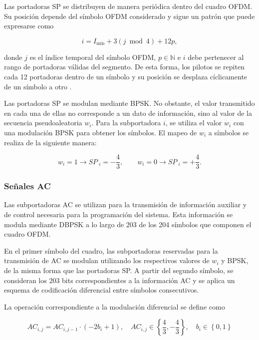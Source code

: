 Las portadoras SP se distribuyen de manera periódica dentro del cuadro OFDM. Su posición depende del símbolo OFDM considerado y sigue un patrón que puede expresarse como

\begin{equation}
i = I_{\min} + 3(j \bmod 4) + 12p,
\end{equation}

donde $j$ es el índice temporal del símbolo OFDM, $p \in \mathbb{N}$ e $i$ debe pertenecer al rango de portadoras válidas del segmento. De esta forma, los pilotos se repiten cada 12 portadoras dentro de un símbolo y su posición se desplaza cíclicamente de un símbolo a otro \cite{portugues}.

Las portadoras SP se modulan mediante BPSK. No obstante, el valor transmitido en cada una de ellas no corresponde a un dato de información, sino al valor de la secuencia pseudoaleatoria $w_i$. Para la subportadora $i$, se utiliza el valor $w_i$ con una modulación BPSK para obtener los símbolos. El mapeo de $w_i$ a símbolos se realiza de la siguiente manera:

\begin{equation}
w_i=1 \rightarrow SP\ _i = -\frac43, \qquad
w_i=0 \rightarrow SP\ _i =+\frac43.
\end{equation}

\subsubsection{Señales AC}
Las subportadoras AC se utilizan para la transmisión de información auxiliar y de control necesaria para la programación del sistema. Esta información se modula mediante DBPSK a lo largo de 203 de los 204 símbolos que componen el cuadro OFDM.

En el primer símbolo del cuadro, las subportadoras reservadas para la transmisión de AC se modulan  utilizando los respectivos valores de $w_i$ y BPSK, de la misma forma que las portadoras SP. A partir del segundo símbolo, se consideran los 203 bits correspondientes a la información AC y se aplica un esquema de codificación diferencial entre símbolos consecutivos.

La operación correspondiente a la modulación diferencial se define como

\begin{equation}
    AC_{i,j} = AC_{i,j-1} \cdot (-2b_i + 1), \quad AC_{i,j} \in \left\lbrace \frac{4}{3}, -\frac{4}{3} \right\rbrace, \quad b_i \in \left\lbrace 0, 1 \right\rbrace
\end{equation}

